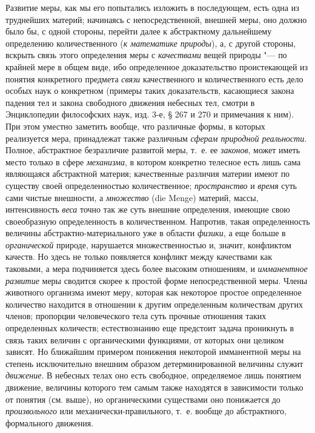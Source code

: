 Развитие меры, как мы его попытались изложить в последующем, есть одна из
труднейших материй; начинаясь с непосредственной, внешней меры, оно должно
было бы, с одной стороны, перейти далее к абстрактному дальнейшему
определению количественного ({\em к математике
природы}), а, с другой стороны, вскрыть связь этого определения меры с
{\em качествами} вещей природы "--- по крайней мере в
общем виде, ибо определенное доказательство проистекающей из понятия
конкретного предмета {\em связи} качественного и
количественного есть дело особых наук о конкретном (примеры таких
доказательств, касающиеся закона падения тел и закона свободного движения
небесных тел, смотри в Энциклопедии философских наук, изд. 3-е, § 267 и 270
и примечания к ним). При этом уместно заметить вообще, что различные формы,
в которых реализуется мера, принадлежат также различным
{\em сферам природной реальности}. Полное, абстрактное
безразличие развитой меры, т.~е. ее {\em законов},
может иметь место только в сфере {\em механизма}, в
котором конкретно телесное есть лишь сама являющаяся абстрактной материя;
качественные различия материи имеют по существу своей определенностью
количественное; {\em пространство} и
{\em время} суть сами чистые внешности, а
{\em множество} (die Menge) материй, массы,
интенсивность {\em веса} точно так же суть внешние
определения, имеющие свою своеобразную определенность в количественном.
Напротив, такая определенность величины абстрактно-материального уже в
области {\em физики}, а еще больше в
{\em органической} природе, нарушается множественностью
и, значит, конфликтом качеств. Но здесь не только появляется конфликт между
качествами как таковыми, а мера подчиняется здесь более высоким отношениям,
и {\em имманентное развитие} меры сводится скорее к
простой форме непосредственной меры. Члены животного организма имеют меру,
которая как некоторое простое определенное количество находится в отношении
к другим определенным количествам других членов; пропорции человеческого
тела суть прочные отношения таких определенных количеств; естествознанию
еще предстоит задача проникнуть в связь таких величин с органическими
функциями, от которых они целиком зависят. Но ближайшим примером понижения
некоторой имманентной меры на степень исключительно внешним образом
детерминированной величины служит {\em движение}. В
небесных телах оно есть свободное, определяемое лишь понятием движение,
величины которого тем самым также находятся в зависимости только от понятия
(см. выше), но органическими существами оно понижается до
{\em произвольного} или механически-правильного, т.~е.
вообще до абстрактного, формального движения.

